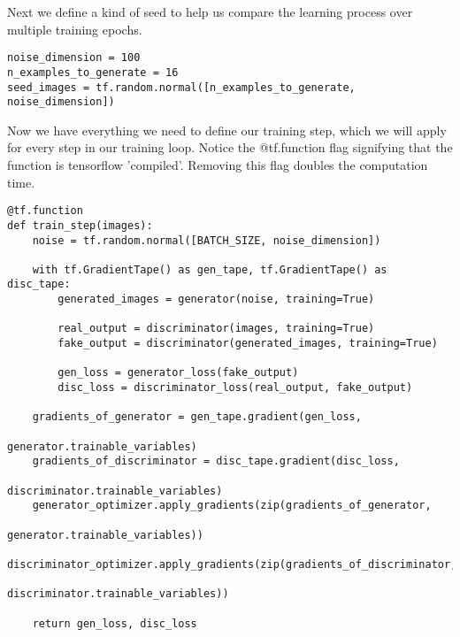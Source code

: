 \documentclass[%
oneside,                 %
final,                   %
10pt]{article}
\begin{document}
Next we define a kind of seed to help us compare the learning process over
multiple training epochs.





\begin{verbatim}
noise_dimension = 100
n_examples_to_generate = 16
seed_images = tf.random.normal([n_examples_to_generate, noise_dimension])

\end{verbatim}


Now we have everything we need to define our training step, which we will apply
for every step in our training loop. Notice the @tf.function flag signifying
that the function is tensorflow 'compiled'. Removing this flag doubles the
computation time.

























\begin{verbatim}
@tf.function
def train_step(images):
    noise = tf.random.normal([BATCH_SIZE, noise_dimension])

    with tf.GradientTape() as gen_tape, tf.GradientTape() as disc_tape:
        generated_images = generator(noise, training=True)

        real_output = discriminator(images, training=True)
        fake_output = discriminator(generated_images, training=True)

        gen_loss = generator_loss(fake_output)
        disc_loss = discriminator_loss(real_output, fake_output)

    gradients_of_generator = gen_tape.gradient(gen_loss,
                                            generator.trainable_variables)
    gradients_of_discriminator = disc_tape.gradient(disc_loss,
                                            discriminator.trainable_variables)
    generator_optimizer.apply_gradients(zip(gradients_of_generator,
                                            generator.trainable_variables))
    discriminator_optimizer.apply_gradients(zip(gradients_of_discriminator,
                                            discriminator.trainable_variables))

    return gen_loss, disc_loss

\end{verbatim}
\end{document}
